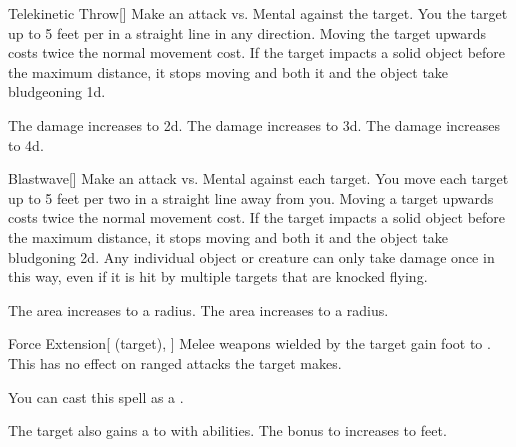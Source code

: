 \lowercase{\hypertarget{spell:Telekinetic Throw}{}}\label{spell:Telekinetic Throw}
\begin{freeability}[Rank 2]{\hypertarget{spell:Telekinetic Throw}{Telekinetic Throw}}[]
Make an attack vs. Mental against the target.
\hit You  the target up to 5 feet per  in a straight line in any direction.
Moving the target upwards costs twice the normal movement cost.
If the target impacts a solid object before the maximum distance, it stops moving and both it and the object take bludgeoning  \plus1d.

\rankline
{} The damage increases to  \plus2d.
 The damage increases to  \plus3d.
 The damage increases to  \plus4d.
\end{freeability}
\vspace{0.25em}



\lowercase{\hypertarget{spell:Blastwave}{}}\label{spell:Blastwave}
\begin{freeability}[Rank 3]{\hypertarget{spell:Blastwave}{Blastwave}}[]
Make an attack vs. Mental against each target.
\hit You move each target up to 5 feet per two  in a straight line away from you.
Moving a target upwards costs twice the normal movement cost.
If the target impacts a solid object before the maximum distance, it stops moving and both it and the object take bludgoning  \minus2d.
Any individual object or creature can only take damage once in this way, even if it is hit by multiple targets that are knocked flying.

\rankline
{} The area increases to a \arealarge radius.
 The area increases to a \areahuge radius.
\end{freeability}
\vspace{0.25em}



\lowercase{\hypertarget{spell:Force Extension}{}}\label{spell:Force Extension}
\begin{attuneability}[Rank 3]{\hypertarget{spell:Force Extension}{Force Extension}}[ (target), ]
Melee weapons wielded by the target gain  foot  to .
This has no effect on ranged attacks the target makes.

You can cast this spell as a .

\rankline
{} The target also gains a   to  with  abilities.
 The bonus to  increases to  feet.
\end{attuneability}
\vspace{0.25em}



